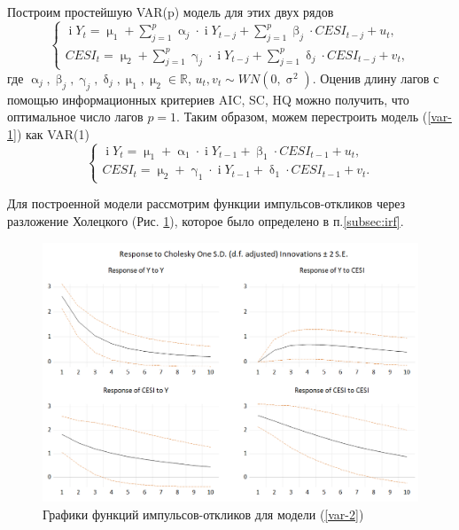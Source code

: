 \documentclass[a4paper, 14pt]{extreport}
\numberwithin{equation}{section}
\renewcommand{\alpha}{\upalpha}
\renewcommand{\beta}{\upbeta}
\renewcommand{\gamma}{\upgamma}
\renewcommand{\delta}{\updelta}
\renewcommand{\mu}{\upmu}
\renewcommand{\sigma}{\upsigma}
\renewcommand{\i}{\operatorname{i}}
\numberwithin{equation}{section}
\begin{document}
	 Построим простейшую VAR(p) модель для этих двух рядов
	 \begin{equation}\label{var-1}
	 	\begin{cases}
 		\i Y_{t} = \mu_1 + \sum\limits_{j=1}^{p} \alpha_j\cdot  \i Y_{t-j} + \sum\limits_{j=1}^{p} \beta_j\cdot  {CESI}_{t-j} + u_t,\\
	 	 {CESI}_{t} = \mu_2 + \sum\limits_{j=1}^{p} \gamma_j\cdot  \i Y_{t-j} + \sum\limits_{j=1}^{p} \delta_j \cdot {CESI}_{t-j} + v_t,
	 	\end{cases}
	 \end{equation}
	 где $\alpha_j, \beta_j, \gamma_j, \delta_j, \mu_1,\mu_2 \in \mathbb R$, $u_t,v_t \sim WN(0,\sigma^2)$. Оценив длину лагов с помощью информационных критериев AIC, SC, HQ можно получить, что оптимальное число лагов $p=1$. Таким образом, можем перестроить модель (\ref{var-1}) как VAR(1)
	  \begin{equation}\label{var-2}
	 	\begin{cases}
	 		\i Y_{t} = \mu_1 + \alpha_1\cdot  \i Y_{t-1} + \beta_1\cdot  {CESI}_{t-1} + u_t,\\
	 		{CESI}_{t} = \mu_2 +  \gamma_1\cdot  \i Y_{t-1} + \delta_1 \cdot {CESI}_{t-1} + v_t.
	 	\end{cases}
	 \end{equation}
	 
	 Для построенной модели рассмотрим функции импульсов-откликов через разложение Холецкого (Рис. \ref{fig:image04}), которое было определено в п.\ref{subsec:irf}.
	 
	 \begin{figure}[h]
	 	\centering
	 	\includegraphics[scale=0.5]{images/image04}
	 	\caption{Графики функций импульсов-откликов для модели (\ref{var-2})}
	 	\label{fig:image04}
	 \end{figure}
	 
\end{document}
